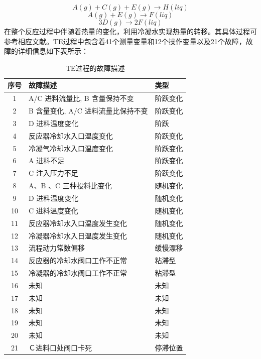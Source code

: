 \begin{equation}
A(g)+C(g)+E(g)\rightarrow H(liq)
\end{equation}
\begin{equation}
A(g)+E(g)\rightarrow F(liq)
\end{equation}
\begin{equation}
3D(g)\rightarrow 2F(liq)
\end{equation}
在整个反应过程中伴随着热量的变化，利用冷凝水实现热量的转移。其具体过程可参考相应文献。TE过程中包含着41个测量变量和12个操作变量以及21个故障，故障的详细信息如下表所示：
\begin{table}[!htb]%
\centering
\caption{TE过程的故障描述}
\label{TEfault}
\begin{tabular}{c l l }

  \hline \hline
   序号 & 故障描述 & 类型 \\
  \hline
  1 & A/C 进料流量比, B 含量保持不变 & 阶跃变化 \\
  2 & B 含量变化, A/C 进料流量比保持不变 & 阶跃变化 \\
  3 & D 进料温度变化 & 阶跃 \\
  4 & 反应器冷却水入口温度变化 & 阶跃变化 \\
  5 & 冷凝气冷却水入口温度变化 & 阶跃变化 \\
  6 & A 进料不足 & 阶跃变化 \\
  7 & C 注入压力不足 & 阶跃变化 \\
  8 & A、B 、C 三种投料比变化 & 随机变化 \\
  9 & D 进料温度变化 & 随机变化 \\
  10 & C 进料温度变化 & 随机变化 \\
  11 & 反应器冷却水入口温度发生变化 & 随机变化 \\
  12 & 冷凝器冷却水入日温度发生变化   & 随机变化 \\
  13 & 流程动力常数偏移 & 缓慢漂移 \\
  14 & 反应器的冷却水阀口工作不正常 & 粘滞型 \\
  15 & 冷凝器的冷却水阀口工作不正常 & 粘滞型 \\
  16 & 未知 & 未知 \\
  17 & 未知 & 未知 \\
  18 & 未知 & 未知 \\
  19 & 未知 & 未知 \\
  20 & 未知 & 未知 \\
  21 & Ｃ进料口处阀口卡死 & 停滞位置 \\
  \hline \hline
\end{tabular}
 \vspace*{-.4cm}
\end{table}
